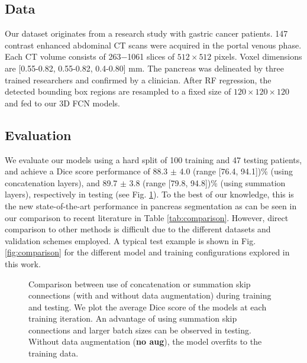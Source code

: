 \documentclass[a4paper]{spie}  %
\begin{document}
\subsection{Data}
Our dataset originates from a research study with gastric cancer patients. 147 contrast enhanced abdominal CT scans were acquired in the portal venous phase. Each CT volume consists of 263−1061 slices of $512\times512$ pixels. Voxel dimensions are [0.55-0.82, 0.55-0.82, 0.4-0.80] mm. The pancreas was delineated by three trained researchers and confirmed by a clinician. After RF regression, the detected bounding box regions are resampled to a fixed size of $120\times120\times120$ and fed to our 3D FCN models. 
\subsection{Evaluation}
We evaluate our models using a hard split of 100 training and 47 testing patients, and achieve a Dice score performance of 88.3 $\pm$ 4.0 (range [76.4, 94.1])\% (using concatenation layers), and 89.7 $\pm$ 3.8 (range [79.8, 94.8])\% (using summation layers), respectively in testing (see Fig. \ref{fig:training}). To the best of our knowledge, this is the new state-of-the-art performance in pancreas segmentation as can be seen in our comparison to recent literature in Table \ref{tab:comparison}. However, direct comparison to other methods is difficult due to the different datasets and validation schemes employed. A typical test example is shown in Fig. \ref{fig:comparison} for the different model and training configurations explored in this work.
\begin{figure}[tb]
	\centering
	\caption{Comparison between use of concatenation or summation skip connections (with and without data augmentation) during training and testing. We plot the average Dice score of the models at each training iteration. An advantage of using summation skip connections and larger batch sizes can be observed in testing. Without data augmentation (\textbf{no aug}), the model overfits to the training data. \label{fig:training}}
\end{figure}
\end{document}
